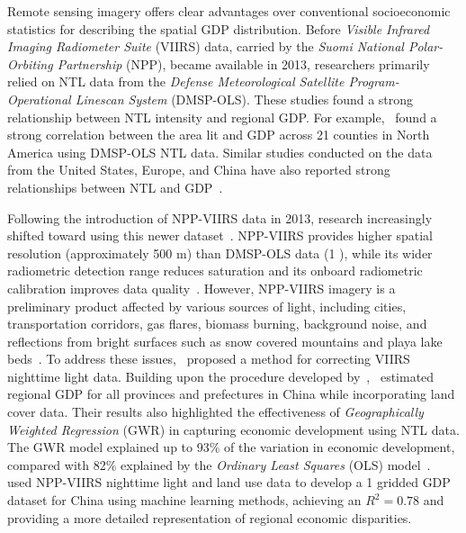 \documentclass[11pt]{article} %
\newcommand{\km}{\text{km}}
\begin{document}
Remote sensing imagery offers clear advantages over conventional socioeconomic statistics for describing the spatial GDP distribution. Before \emph{Visible Infrared Imaging Radiometer Suite} (VIIRS) data, carried by the \emph{Suomi National Polar-Orbiting Partnership} (NPP), became available in 2013, researchers primarily relied on NTL data from the \emph{Defense Meteorological Satellite Program-Operational Linescan System} (DMSP-OLS). These studies found a strong relationship between NTL intensity and regional GDP. For example,~\textcite{elv-bau-kih:US-GDP-NTL} found a strong correlation between the area lit and GDP across 21 counties in North America using DMSP-OLS NTL data. Similar studies conducted on the data from the United States, Europe, and China have also reported strong relationships between NTL and GDP~\parencite{dol-mul-mor:EU-GDP-NTL, zha-cur-sam:CN-GDP-NTL, for:US-GDP-NTL}.

Following the introduction of NPP-VIIRS data in 2013, research increasingly shifted toward using this newer dataset~\parencite{li-xu-che:potential-VIIRS,zha-che-zho:SouthCN-GDP-NTL}. NPP-VIIRS provides higher spatial resolution (approximately 500 m) than DMSP-OLS data (1 \km), while its wider radiometric detection range reduces saturation and its onboard radiometric calibration improves data quality~\parencite{elv-bau-zhi:VIIRS-DMSP}. However, NPP-VIIRS imagery is a preliminary product affected by various sources of light, including cities, transportation corridors, gas flares, biomass burning, background noise, and reflections from bright surfaces such as snow covered mountains and playa lake beds~\parencite{elv-bau-zhi:VIIRS-DMSP}. To address these issues,~\textcite{zha-che-zho:SouthCN-GDP-NTL} proposed a method for correcting VIIRS nighttime light data. Building upon the procedure developed by~\textcite{zha-che-zho:SouthCN-GDP-NTL},~\textcite{xu-zha-jia:CN-GDP-NTL-LC} estimated regional GDP for all provinces and prefectures in China while incorporating land cover data. Their results also highlighted the effectiveness of \emph{Geographically Weighted Regression} (GWR) in capturing economic development using NTL data. The GWR model explained up to 93\% of the variation in economic development, compared with 82\% explained by the \emph{Ordinary Least Squares} (OLS) model~\parencite{xu-zha-jia:CN-GDP-NTL-LC}.~\textcite{liu-liu-zho:map-GDP-NTL-ML} used NPP-VIIRS nighttime light and land use data to develop a 1 \km gridded GDP dataset for China using machine learning methods, achieving an $R^2 = 0.78$ and providing a more detailed representation of regional economic disparities.
\end{document}
